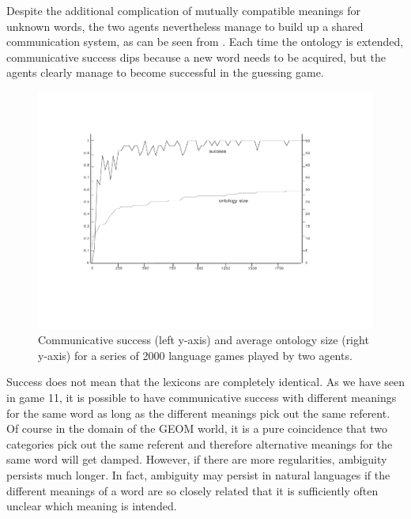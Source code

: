 Despite the additional complication of mutually 
compatible meanings for unknown words, the two agents
nevertheless manage to 
build up a shared communication system, as can be seen 
from . Each time the ontology is 
extended, communicative success dips because a new 
word needs to be acquired, but the agents clearly 
manage to become successful in the guessing game. 

\begin{figure}[htbp]
  \centerline{\includegraphics[width=.80\textwidth]{chap6/figs/gsucc3}}
\caption{\label{gsucc3} Communicative 
success (left y-axis) and average ontology size 
(right y-axis) for a series of 2000
language games played by two agents.} 
\end{figure}
Success does not mean that the lexicons are completely 
identical. As we have seen in game 11, it is possible
to have communicative success with different 
meanings for the same word as long as the different meanings
pick out the same referent. Of course in the domain of
the GEOM world, it is a pure coincidence that two categories
pick out the same referent and therefore alternative 
meanings for the same word will get damped. However, if there
are more regularities, ambiguity persists much longer. 
In fact, ambiguity may persist in natural languages if 
the different meanings of a word are so 
closely related that it is sufficiently often unclear
which meaning is intended. 

